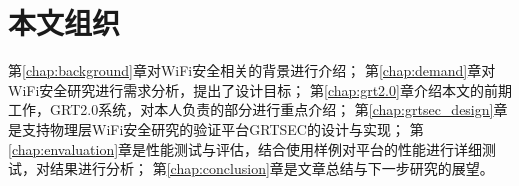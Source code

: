 	\section{本文组织}
	第\ref{chap:background}章对WiFi安全相关的背景进行介绍；
	第\ref{chap:demand}章对WiFi安全研究进行需求分析，提出了设计目标；
	第\ref{chap:grt2.0}章介绍本文的前期工作，GRT2.0系统，对本人负责的部分进行重点介绍；
	第\ref{chap:grtsec_design}章是支持物理层WiFi安全研究的验证平台GRTSEC的设计与实现；
	第\ref{chap:envaluation}章是性能测试与评估，结合使用样例对平台的性能进行详细测试，对结果进行分析；
	第\ref{chap:conclusion}章是文章总结与下一步研究的展望。
